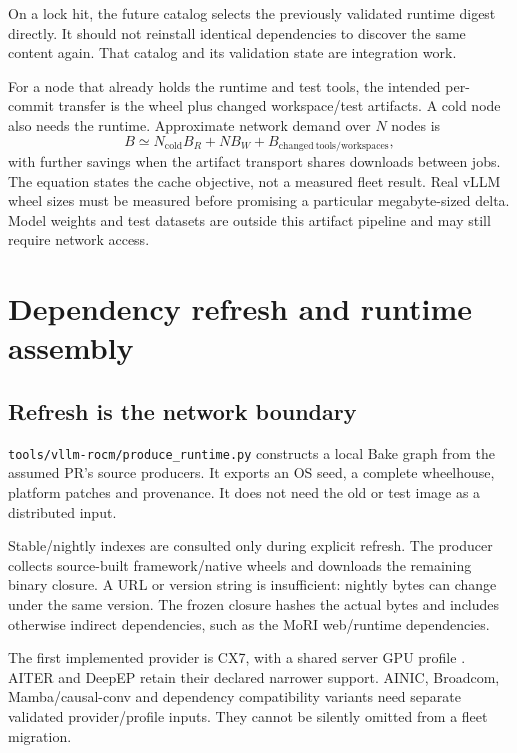 \documentclass[11pt,a4paper]{article}
\newcommand{\file}[1]{\nolinkurl{#1}}
\newcommand{\term}[1]{\texttt{\detokenize{#1}}}
\begin{document}
On a lock hit, the future catalog selects the previously validated runtime
digest directly. It should not reinstall identical dependencies to discover the
same content again. That catalog and its validation state are integration work.

For a node that already holds the runtime and test tools, the intended per-commit
transfer is the wheel plus changed workspace/test artifacts. A cold node also
needs the runtime. Approximate network demand over $N$ nodes is
\[
 B \simeq N_{\mathrm{cold}} B_R
       + N B_W + B_{\mathrm{changed\ tools/workspaces}},
\]
with further savings when the artifact transport shares downloads between jobs.
The equation states the cache objective, not a measured fleet result. Real
vLLM wheel sizes must be measured before promising a particular megabyte-sized
delta. Model weights and test datasets are outside this artifact pipeline and
may still require network access.

\section{Dependency refresh and runtime assembly}

\subsection{Refresh is the network boundary}

\file{tools/vllm-rocm/produce_runtime.py} constructs a local Bake graph from the
assumed PR's source producers. It exports an OS seed, a complete wheelhouse,
platform patches and provenance. It does not need the old \term{ci_base} or
test image as a distributed input.

Stable/nightly indexes are consulted only during explicit refresh. The producer
collects source-built framework/native wheels and downloads the remaining binary
closure. A URL or version string is insufficient: nightly bytes can change under
the same version. The frozen closure hashes the actual bytes and includes
otherwise indirect dependencies, such as the MoRI web/runtime dependencies.

The first implemented provider is CX7, with a shared server GPU profile
\term{gfx90a;gfx942;gfx950}. AITER and DeepEP retain their declared narrower
\term{gfx942;gfx950} support. AINIC, Broadcom, Mamba/causal-conv and dependency
compatibility variants need separate validated provider/profile inputs. They
cannot be silently omitted from a fleet migration.
\end{document}
